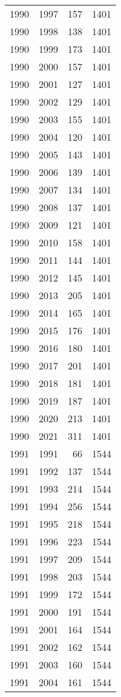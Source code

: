 \documentclass[
  10pt,
  letterpaper,
  DIV=11,
  numbers=noendperiod,
  twoside]{scrartcl}
\begin{document}
\begin{longtable}[]{@{}rrrr@{}}
1990 & 1997 & 157 & 1401 \\
1990 & 1998 & 138 & 1401 \\
1990 & 1999 & 173 & 1401 \\
1990 & 2000 & 157 & 1401 \\
1990 & 2001 & 127 & 1401 \\
1990 & 2002 & 129 & 1401 \\
1990 & 2003 & 155 & 1401 \\
1990 & 2004 & 120 & 1401 \\
1990 & 2005 & 143 & 1401 \\
1990 & 2006 & 139 & 1401 \\
1990 & 2007 & 134 & 1401 \\
1990 & 2008 & 137 & 1401 \\
1990 & 2009 & 121 & 1401 \\
1990 & 2010 & 158 & 1401 \\
1990 & 2011 & 144 & 1401 \\
1990 & 2012 & 145 & 1401 \\
1990 & 2013 & 205 & 1401 \\
1990 & 2014 & 165 & 1401 \\
1990 & 2015 & 176 & 1401 \\
1990 & 2016 & 180 & 1401 \\
1990 & 2017 & 201 & 1401 \\
1990 & 2018 & 181 & 1401 \\
1990 & 2019 & 187 & 1401 \\
1990 & 2020 & 213 & 1401 \\
1990 & 2021 & 311 & 1401 \\
1991 & 1991 & 66 & 1544 \\
1991 & 1992 & 137 & 1544 \\
1991 & 1993 & 214 & 1544 \\
1991 & 1994 & 256 & 1544 \\
1991 & 1995 & 218 & 1544 \\
1991 & 1996 & 223 & 1544 \\
1991 & 1997 & 209 & 1544 \\
1991 & 1998 & 203 & 1544 \\
1991 & 1999 & 172 & 1544 \\
1991 & 2000 & 191 & 1544 \\
1991 & 2001 & 164 & 1544 \\
1991 & 2002 & 162 & 1544 \\
1991 & 2003 & 160 & 1544 \\
1991 & 2004 & 161 & 1544 \\

\end{longtable}
\end{document}
